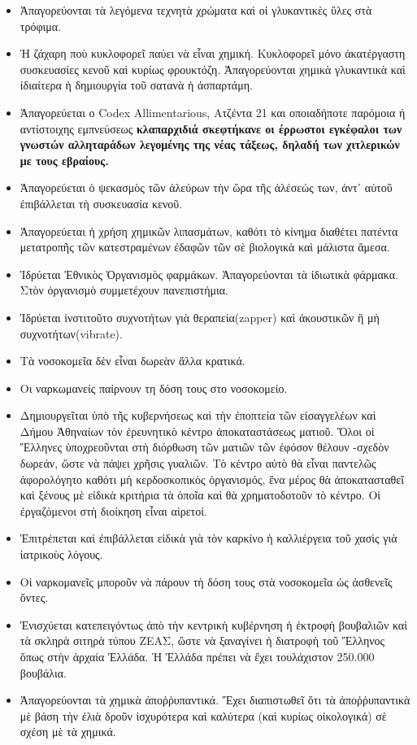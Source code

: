 \documentclass[a4paper]{article}
\begin{document}
\begin{itemize}
\item Ἀπαγορεύονται τὰ λεγόμενα τεχνητὰ χρώματα καὶ οἱ γλυκαντικὲς ὕλες στὰ τρόφιμα.
\item Ἡ ζάχαρη ποὺ κυκλοφορεῖ παύει νὰ εἶναι χημική. Κυκλοφορεῖ μόνο ἀκατέργαστη συσκευασίες κενοῦ καὶ κυρίως φρουκτόζη. Ἀπαγορεύονται χημικὰ γλυκαντικὰ καὶ ἰδιαίτερα ἡ δημιουργία τοῦ σατανὰ ἡ ἀσπαρτάμη.
\item Ἀπαγορεύεται ο Codex Allimentarious, Ατζέντα 21 και οποιαδήποτε παρόμοια ή αντίστοιχης εμπνεύσεως \textbf{κλαπαρχιδιά σκεφτήκανε οι έρρωστοι εγκέφαλοι των γνωστών αλληταράδων λεγομένης της νέας τάξεως, δηλαδή των χιτλερικών με τους εβραίους.}
\item Ἀπαγορεύεται ὁ ψεκασμὸς τῶν ἀλεύρων τὴν ὥρα τῆς ἀλέσεώς των, ἀντ᾿ αὐτοῦ ἐπιβάλλεται τὴ συσκευασία κενοῦ.
\item Ἀπαγορεύεται ἡ χρήση χημικῶν λιπασμάτων, καθότι τὸ κίνημα διαθέτει πατέντα μετατροπῆς τῶν κατεστραμένων ἐδαφῶν τῶν σὲ βιολογικὰ καὶ μάλιστα ἄμεσα.
\item Ἱδρύεται Ἐθνικὸς Ὀργανισμὸς φαρμάκων. Ἀπαγορεύονται τὰ ἰδιωτικὰ φάρμακα. Στὸν ὀργανισμὸ συμμετέχουν πανεπιστήμια.
\item Ἱδρύεται ἰνστιτοῦτο συχνοτήτων γιὰ θεραπεία(zapper) καὶ ἀκουστικῶν ἢ μὴ συχνοτήτων(vibrate).
\item Τὰ νοσοκομεῖα δὲν εἶναι δωρεὰν ἄλλα κρατικά.
\item Οι ναρκωμανείς παίρνουν τη δόση τους στο νοσοκομείο.
\item Δημιουργεῖται ὑπὸ τῆς κυβερνήσεως καὶ τὴν ἐποπτεία τῶν εἰσαγγελέων καὶ Δήμου Ἀθηναίων τὸν ἐρευνητικὸ κέντρο ἀποκαταστάσεως ματιοῦ. Ὅλοι οἱ Ἕλληνες ὑποχρεοῦνται στὴ διόρθωση τῶν ματιῶν τῶν ἐφόσον θέλουν -σχεδὸν δωρεάν, ὥστε νὰ πάψει χρῆσις γυαλιῶν. Τὸ κέντρο αὐτὸ θὰ εἶναι παντελῶς ἀφορολόγητο καθότι μὴ κερδοσκοπικὸς ὀργανισμός, ἕνα μέρος θὰ ἀποκατασταθεῖ καὶ ξένους μὲ εἰδικὰ κριτήρια τὰ ὁποῖα καὶ θὰ χρηματοδοτοῦν τὸ κέντρο. Οἱ ἐργαζόμενοι στὴ διοίκηση εἶναι αἱρετοί.
\item Ἐπιτρέπεται καὶ ἐπιβάλλεται εἰδικὰ γιὰ τὸν καρκίνο ἡ καλλιέργεια τοῦ χασὶς γιὰ ἰατρικοὺς λόγους.
\item Οἱ ναρκομανεῖς μποροῦν νὰ πάρουν τὴ δόση τους στὰ νοσοκομεῖα ὡς ἀσθενεῖς ὄντες.
\item Ἐνισχύεται κατεπειγόντως ἀπὸ τὴν κεντρικὴ κυβέρνηση ἡ ἐκτροφὴ βουβαλιῶν καὶ τὰ σκληρὰ σιτηρὰ τύπου ΖΕΑΣ, ὥστε νὰ ξαναγίνει ἡ διατροφὴ τοῦ Ἕλληνος ὅπως στὴν ἀρχαία Ἑλλάδα. Ἡ Ἑλλάδα πρέπει νὰ ἔχει τουλάχιστον 250.000 βουβάλια.
\item Ἀπαγορεύονται τὰ χημικὰ ἀποῤῥυπαντικά. Ἔχει διαπιστωθεῖ ὅτι τὰ ἀποῤῥυπαντικὰ μὲ βάση τὴν ἐλιὰ δροῦν ἰσχυρότερα καὶ καλύτερα (καὶ κυρίως οἰκολογικά) σὲ σχέση μὲ τὰ χημικά.

\end{itemize}
\end{document}
